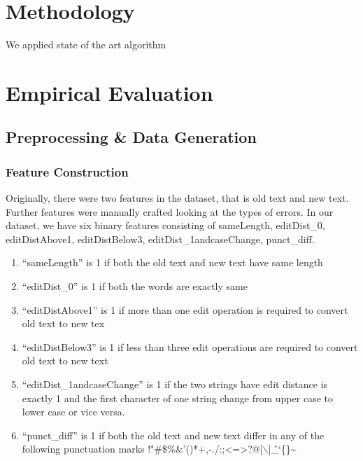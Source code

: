 \documentclass[letterpaper]{article}
\def\mydoubleq#1{``#1''}
\begin{document}
\section{Methodology}
We applied state of the art algorithm 


\section{Empirical Evaluation}

\subsection{Preprocessing \& Data Generation}

\subsubsection{Feature Construction}
Originally, there were two features in the dataset, that is old text and new text. Further features were manually crafted looking at the types of errors. In our dataset, we have six binary features consisting of sameLength, editDist\_0, editDistAbove1, editDistBelow3, editDist\_1andcaseChange, punct\_diff.
\begin{enumerate}
\item \mydoubleq{sameLength} is 1 if  both the old text and new text have same length
\item \mydoubleq{editDist\_0} is 1 if both the words are exactly same
\item \mydoubleq{editDistAbove1} is 1 if more than one edit operation is required to convert old text to new tex
\item \mydoubleq{editDistBelow3} is 1 if less than three edit operations are required to convert old text to new text
\item \mydoubleq{editDist\_1andcaseChange} is 1 if the two strings have edit distance is exactly 1 and the first character of one string change from upper case to lower case or vice versa.
\item \mydoubleq{punct\_diff} is 1 if both the old text and new text differ in any of the following punctuation marks !"\#\$\%\&'()*+,-./:;\textless=\textgreater?@[$\backslash$]\^\_`\{\textbar\}\textasciitilde
\end{enumerate}
\end{document}
